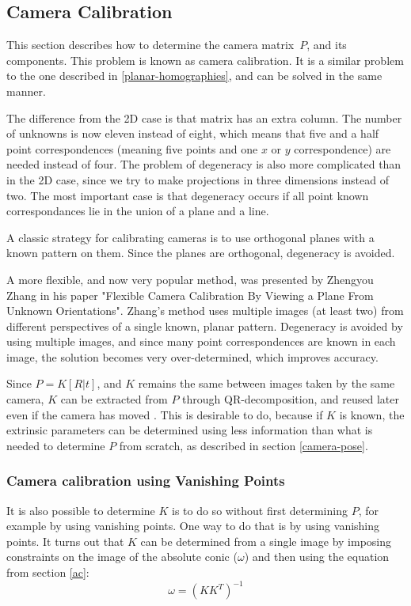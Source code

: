 \subsection{Camera Calibration} \label{camera-calibration}
This section describes how to determine the camera matrix $P$, and its components. %
This problem is known as camera calibration.
It is a similar problem to the one described in \ref{planar-homographies}, and can be solved in the same manner.

The difference from the 2D case is that matrix has an extra column. The number of unknowns is now eleven instead of eight, which means that five and a half point correspondences (meaning five points and one $x$ or $y$ correspondence) are needed instead of four.
The problem of degeneracy is also more complicated than in the 2D case, since we try to make projections in three dimensions instead of two.
The most important case is that degeneracy occurs if all point known correspondances lie in the union of a plane and a line. \cite[179-180]{hartley-zisserman}

A classic strategy for calibrating cameras is to use orthogonal planes with a known pattern on them. 
Since the planes are orthogonal, degeneracy is avoided.

A more flexible, and now very popular method, was presented by Zhengyou Zhang in his paper "Flexible Camera Calibration By Viewing a Plane From Unknown Orientations".
Zhang's method uses multiple images (at least two) from different perspectives of a single known, planar pattern.
Degeneracy is avoided by using multiple images, and since many point correspondences are known in each image, the solution becomes very over-determined, which improves accuracy. \cite{zhang-calibration}

Since $P=K[R|t]$, and $K$ remains the same between images taken by the same camera, $K$ can be extracted from $P$ through QR-decomposition, and reused later even if the camera has moved \cite{wiki:qr-decomposition}. 
This is desirable to do, because if $K$ is known, the extrinsic parameters can be determined using less information than what is needed to determine $P$ from scratch, as described in section \ref{camera-pose}.

\subsubsection{Camera calibration using Vanishing Points}
It is also possible to determine $K$ is to do so without first determining $P$, for example by using vanishing points.
One way to do that is by using vanishing points.
It turns out that $K$ can be determined from a single image by imposing constraints on the image of the absolute conic ($\omega$) and then using the equation from section \ref{ac}:
\begin{equation} \label{eq:conic_k}
	\omega = (KK^T)^{-1}
\end{equation}

